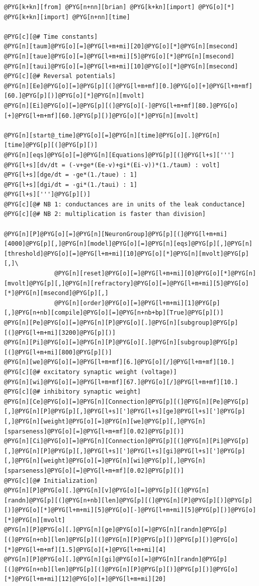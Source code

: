 \documentclass[letterpaper,10pt,english]{manual}
\begin{document}
\begin{Verbatim}[commandchars=@\[\]]
@PYG[k+kn][from] @PYG[n+nn][brian] @PYG[k+kn][import] @PYG[o][*]
@PYG[k+kn][import] @PYG[n+nn][time]

@PYG[c][@# Time constants]
@PYG[n][taum]@PYG[o][=]@PYG[l+m+mi][20]@PYG[o][*]@PYG[n][msecond]
@PYG[n][taue]@PYG[o][=]@PYG[l+m+mi][5]@PYG[o][*]@PYG[n][msecond]
@PYG[n][taui]@PYG[o][=]@PYG[l+m+mi][10]@PYG[o][*]@PYG[n][msecond]
@PYG[c][@# Reversal potentials]
@PYG[n][Ee]@PYG[o][=]@PYG[p][(]@PYG[l+m+mf][0.]@PYG[o][+]@PYG[l+m+mf][60.]@PYG[p][)]@PYG[o][*]@PYG[n][mvolt]
@PYG[n][Ei]@PYG[o][=]@PYG[p][(]@PYG[o][-]@PYG[l+m+mf][80.]@PYG[o][+]@PYG[l+m+mf][60.]@PYG[p][)]@PYG[o][*]@PYG[n][mvolt]

@PYG[n][start@_time]@PYG[o][=]@PYG[n][time]@PYG[o][.]@PYG[n][time]@PYG[p][(]@PYG[p][)]
@PYG[n][eqs]@PYG[o][=]@PYG[n][Equations]@PYG[p][(]@PYG[l+s][''']
@PYG[l+s][dv/dt = (-v+ge*(Ee-v)+gi*(Ei-v))*(1./taum) : volt]
@PYG[l+s][dge/dt = -ge*(1./taue) : 1]
@PYG[l+s][dgi/dt = -gi*(1./taui) : 1]
@PYG[l+s][''']@PYG[p][)]
@PYG[c][@# NB 1: conductances are in units of the leak conductance]
@PYG[c][@# NB 2: multiplication is faster than division]

@PYG[n][P]@PYG[o][=]@PYG[n][NeuronGroup]@PYG[p][(]@PYG[l+m+mi][4000]@PYG[p][,]@PYG[n][model]@PYG[o][=]@PYG[n][eqs]@PYG[p][,]@PYG[n][threshold]@PYG[o][=]@PYG[l+m+mi][10]@PYG[o][*]@PYG[n][mvolt]@PYG[p][,]\
              @PYG[n][reset]@PYG[o][=]@PYG[l+m+mi][0]@PYG[o][*]@PYG[n][mvolt]@PYG[p][,]@PYG[n][refractory]@PYG[o][=]@PYG[l+m+mi][5]@PYG[o][*]@PYG[n][msecond]@PYG[p][,]
              @PYG[n][order]@PYG[o][=]@PYG[l+m+mi][1]@PYG[p][,]@PYG[n+nb][compile]@PYG[o][=]@PYG[n+nb+bp][True]@PYG[p][)]
@PYG[n][Pe]@PYG[o][=]@PYG[n][P]@PYG[o][.]@PYG[n][subgroup]@PYG[p][(]@PYG[l+m+mi][3200]@PYG[p][)]
@PYG[n][Pi]@PYG[o][=]@PYG[n][P]@PYG[o][.]@PYG[n][subgroup]@PYG[p][(]@PYG[l+m+mi][800]@PYG[p][)]
@PYG[n][we]@PYG[o][=]@PYG[l+m+mf][6.]@PYG[o][/]@PYG[l+m+mf][10.] @PYG[c][@# excitatory synaptic weight (voltage)]
@PYG[n][wi]@PYG[o][=]@PYG[l+m+mf][67.]@PYG[o][/]@PYG[l+m+mf][10.] @PYG[c][@# inhibitory synaptic weight]
@PYG[n][Ce]@PYG[o][=]@PYG[n][Connection]@PYG[p][(]@PYG[n][Pe]@PYG[p][,]@PYG[n][P]@PYG[p][,]@PYG[l+s][']@PYG[l+s][ge]@PYG[l+s][']@PYG[p][,]@PYG[n][weight]@PYG[o][=]@PYG[n][we]@PYG[p][,]@PYG[n][sparseness]@PYG[o][=]@PYG[l+m+mf][0.02]@PYG[p][)]
@PYG[n][Ci]@PYG[o][=]@PYG[n][Connection]@PYG[p][(]@PYG[n][Pi]@PYG[p][,]@PYG[n][P]@PYG[p][,]@PYG[l+s][']@PYG[l+s][gi]@PYG[l+s][']@PYG[p][,]@PYG[n][weight]@PYG[o][=]@PYG[n][wi]@PYG[p][,]@PYG[n][sparseness]@PYG[o][=]@PYG[l+m+mf][0.02]@PYG[p][)]
@PYG[c][@# Initialization]
@PYG[n][P]@PYG[o][.]@PYG[n][v]@PYG[o][=]@PYG[p][(]@PYG[n][randn]@PYG[p][(]@PYG[n+nb][len]@PYG[p][(]@PYG[n][P]@PYG[p][)]@PYG[p][)]@PYG[o][*]@PYG[l+m+mi][5]@PYG[o][-]@PYG[l+m+mi][5]@PYG[p][)]@PYG[o][*]@PYG[n][mvolt]
@PYG[n][P]@PYG[o][.]@PYG[n][ge]@PYG[o][=]@PYG[n][randn]@PYG[p][(]@PYG[n+nb][len]@PYG[p][(]@PYG[n][P]@PYG[p][)]@PYG[p][)]@PYG[o][*]@PYG[l+m+mf][1.5]@PYG[o][+]@PYG[l+m+mi][4]
@PYG[n][P]@PYG[o][.]@PYG[n][gi]@PYG[o][=]@PYG[n][randn]@PYG[p][(]@PYG[n+nb][len]@PYG[p][(]@PYG[n][P]@PYG[p][)]@PYG[p][)]@PYG[o][*]@PYG[l+m+mi][12]@PYG[o][+]@PYG[l+m+mi][20]


\end{Verbatim}
\end{document}
